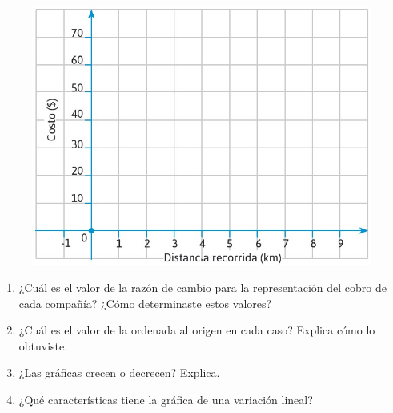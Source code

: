\documentclass[11pt]{book}
\begin{document}
\begin{enumerate}
\begin{enumerate}
\begin{figure}[H]
                  \includegraphics[width=0.5\linewidth]{cartesian_taxi}
                  \label{fig:cartesian_taxi}
                \end{figure}%
                \begin{enumerate}
                  \item ¿Cuál es el valor de la razón de cambio para la representación del cobro de cada compañía? ¿Cómo determinaste estos valores?
                  \item ¿Cuál es el valor de la ordenada al origen en cada caso? Explica cómo lo obtuviste.
                  \item ¿Las gráficas crecen o decrecen? Explica.
                  \item ¿Qué características tiene la gráfica de una variación lineal?
                \end{enumerate}
        \end{enumerate}


\end{enumerate}
\end{document}
